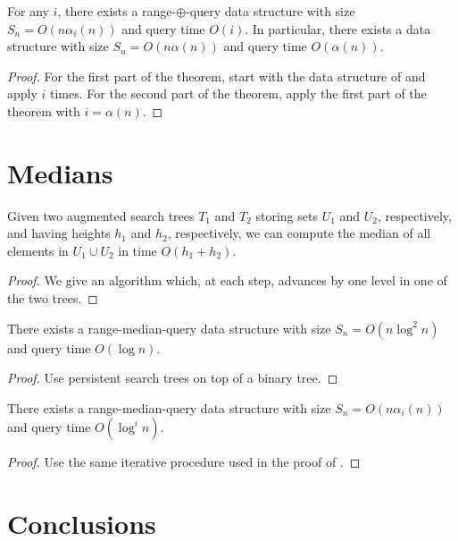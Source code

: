 \documentclass[lotsofwhite]{patmorin}
\begin{document}
\begin{thm}
For any $i$, there exists a range-$\oplus$-query data structure with
size $S_n=O(n\alpha_i(n))$ and query time $O(i)$. In particular, there
exists a data structure with size $S_n=O(n\alpha(n))$ and query time
$O(\alpha(n))$.
\end{thm}

\begin{proof}
For the first part of the theorem, start with the data structure of
 and apply  $i$ times.  For the
second part of the theorem, apply the first part of the theorem with
$i=\alpha(n)$.
\end{proof}

\section{Medians}

\begin{lem}
Given two augmented search trees $T_1$ and $T_2$ storing sets $U_1$
and $U_2$, respectively, and having heights $h_1$ and $h_2$,
respectively, we can compute the median of all elements in $U_1\cup
U_2$ in time $O(h_1+h_2)$.
\end{lem}

\begin{proof}
We give an algorithm which, at each step, advances by one level in one
of the two trees.
\end{proof}

\begin{thm}
There exists a range-median-query data structure with size
$S_n=O(n\log^2 n)$ and query time $O(\log n)$.
\end{thm}

\begin{proof}
Use persistent search trees on top of a binary tree.
\end{proof}

\begin{thm}
There exists a range-median-query data structure with size
$S_n=O(n\alpha_i(n))$ and query time $O(\log^i n)$.
\end{thm}

\begin{proof}
Use the same iterative procedure used in the proof of
.
\end{proof}

\section{Conclusions}
\end{document}

